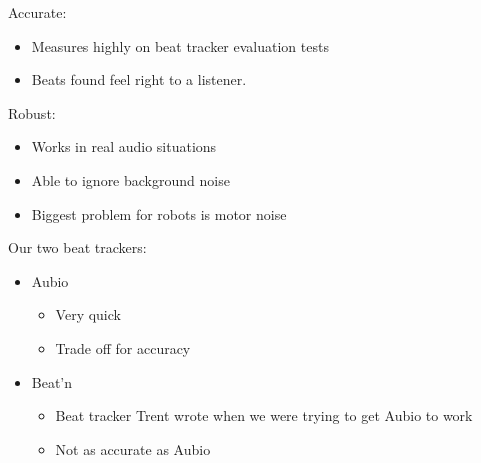 \documentclass{beamer}
\begin{document}
	\begin{frame}
		Accurate:
		\begin{itemize}
			\item Measures highly on beat tracker evaluation tests
			\item Beats found feel right to a listener.
		\end{itemize}
	\end{frame}
	\begin{frame}
		Robust:
		\begin{itemize}
			\item Works in real audio situations
			\item Able to ignore background noise
			\item Biggest problem for robots is motor noise
		\end{itemize}
	\end{frame}
	\begin{frame}
		Our two beat trackers:
		\begin{itemize}
			\item Aubio
				\begin{itemize}
					\item Very quick
					\item Trade off for accuracy
				\end{itemize}
			\item Beat'n
				\begin{itemize}
					\item Beat tracker Trent wrote when we were trying to get Aubio to work
					\item Not as accurate as Aubio
				\end{itemize}
		\end{itemize}
	\end{frame}
\end{document}

